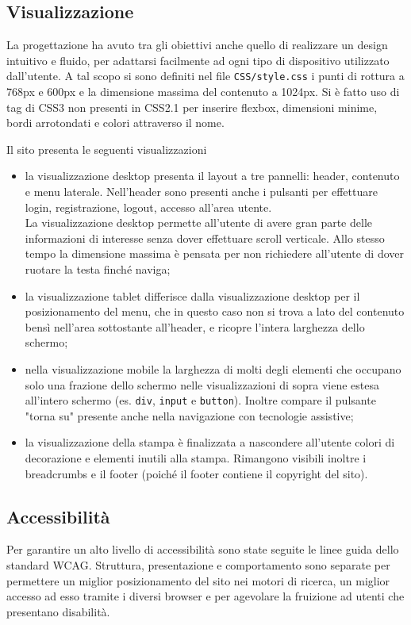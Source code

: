 \documentclass[12pt,a4paper,headings=optiontohead]{article}
\begin{document}
\subsection{Visualizzazione}
La progettazione ha avuto tra gli obiettivi anche quello di realizzare un design intuitivo e fluido, per adattarsi facilmente ad ogni tipo di dispositivo utilizzato dall'utente.
A tal scopo si sono definiti nel file \texttt{CSS/style.css} i punti di rottura a 768px e 600px e la dimensione massima del contenuto a 1024px.
Si è fatto uso di tag di CSS3 non presenti in CSS2.1 per inserire flexbox, dimensioni minime, bordi arrotondati e colori attraverso il nome.

Il sito presenta le seguenti visualizzazioni
\begin{itemize}
\item la visualizzazione desktop presenta il layout a tre pannelli: header, contenuto e menu laterale. Nell'header sono presenti anche i pulsanti per effettuare login, registrazione, logout, accesso all'area utente.\\
La visualizzazione desktop permette all'utente di avere gran parte delle informazioni di interesse senza dover effettuare scroll verticale. Allo stesso tempo la dimensione massima è pensata per non richiedere all'utente di dover ruotare la testa finché naviga;
\item la visualizzazione tablet differisce dalla visualizzazione desktop per il posizionamento del menu, che in questo caso non si trova a lato del contenuto bensì nell'area sottostante all'header, e ricopre l'intera larghezza dello schermo;
\item nella visualizzazione mobile la larghezza di molti degli elementi che occupano solo una frazione dello schermo nelle visualizzazioni di sopra viene estesa all'intero schermo (es. \texttt{div}, \texttt{input} e \texttt{button}). Inoltre compare il pulsante "torna su" presente anche nella navigazione con tecnologie assistive;
\item la visualizzazione della stampa è finalizzata a nascondere all'utente colori di decorazione e elementi inutili alla stampa. Rimangono visibili inoltre i breadcrumbs e il footer (poiché il footer contiene il copyright del sito).
\end{itemize}

\subsection{Accessibilità}
	Per garantire un alto livello di accessibilità sono state seguite le linee guida dello standard WCAG. Struttura, presentazione e comportamento sono separate per permettere un miglior posizionamento del sito nei motori di ricerca, un miglior accesso ad esso tramite i diversi browser e per agevolare la fruizione ad utenti che presentano disabilità.
\end{document}
